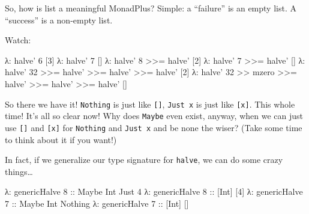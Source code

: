 \documentclass[]{article}
\newenvironment{Shaded}{}{}
\newcommand{\KeywordTok}[1]{\textcolor[rgb]{0.00,0.44,0.13}{\textbf{{#1}}}}
\newcommand{\DataTypeTok}[1]{\textcolor[rgb]{0.56,0.13,0.00}{{#1}}}
\newcommand{\DecValTok}[1]{\textcolor[rgb]{0.25,0.63,0.44}{{#1}}}
\newcommand{\OtherTok}[1]{\textcolor[rgb]{0.00,0.44,0.13}{{#1}}}
\newcommand{\FunctionTok}[1]{\textcolor[rgb]{0.02,0.16,0.49}{{#1}}}
\newcommand{\NormalTok}[1]{{#1}}
\begin{document}
So, how is list a meaningful MonadPlus? Simple: a ``failure'' is an empty list. A ``success'' is a
non-empty list.

Watch:

\begin{Shaded}
\begin{Highlighting}[]
\NormalTok{λ}\FunctionTok{:} \NormalTok{halve' }\DecValTok{6}
\NormalTok{[}\DecValTok{3}\NormalTok{]}
\NormalTok{λ}\FunctionTok{:} \NormalTok{halve' }\DecValTok{7}
\NormalTok{[]}
\NormalTok{λ}\FunctionTok{:} \NormalTok{halve' }\DecValTok{8} \FunctionTok{>>=} \NormalTok{halve'}
\NormalTok{[}\DecValTok{2}\NormalTok{]}
\NormalTok{λ}\FunctionTok{:} \NormalTok{halve' }\DecValTok{7} \FunctionTok{>>=} \NormalTok{halve'}
\NormalTok{[]}
\NormalTok{λ}\FunctionTok{:} \NormalTok{halve' }\DecValTok{32} \FunctionTok{>>=} \NormalTok{halve' }\FunctionTok{>>=} \NormalTok{halve' }\FunctionTok{>>=} \NormalTok{halve'}
\NormalTok{[}\DecValTok{2}\NormalTok{]}
\NormalTok{λ}\FunctionTok{:} \NormalTok{halve' }\DecValTok{32} \FunctionTok{>>} \NormalTok{mzero }\FunctionTok{>>=} \NormalTok{halve' }\FunctionTok{>>=} \NormalTok{halve' }\FunctionTok{>>=} \NormalTok{halve'}
\NormalTok{[]}
\end{Highlighting}
\end{Shaded}

So there we have it! \texttt{Nothing} is just like \texttt{{[}{]}}, \texttt{Just\ x} is just like
\texttt{{[}x{]}}. This whole time! It's all so clear now! Why does \texttt{Maybe} even exist,
anyway, when we can just use \texttt{{[}{]}} and \texttt{{[}x{]}} for \texttt{Nothing} and
\texttt{Just\ x} and be none the wiser? (Take some time to think about it if you want!)

In fact, if we generalize our type signature for \texttt{halve}, we can do some crazy things\ldots{}

\begin{Shaded}
\end{Shaded}

\begin{Shaded}
\begin{Highlighting}[]
\NormalTok{λ}\FunctionTok{:} \NormalTok{genericHalve }\DecValTok{8}\OtherTok{ ::} \DataTypeTok{Maybe} \DataTypeTok{Int}
\DataTypeTok{Just} \DecValTok{4}
\NormalTok{λ}\FunctionTok{:} \NormalTok{genericHalve }\DecValTok{8}\OtherTok{ ::} \NormalTok{[}\DataTypeTok{Int}\NormalTok{]}
\NormalTok{[}\DecValTok{4}\NormalTok{]}
\NormalTok{λ}\FunctionTok{:} \NormalTok{genericHalve }\DecValTok{7}\OtherTok{ ::} \DataTypeTok{Maybe} \DataTypeTok{Int}
\DataTypeTok{Nothing}
\NormalTok{λ}\FunctionTok{:} \NormalTok{genericHalve }\DecValTok{7}\OtherTok{ ::} \NormalTok{[}\DataTypeTok{Int}\NormalTok{]}
\NormalTok{[]}
\end{Highlighting}
\end{Shaded}
\end{document}
